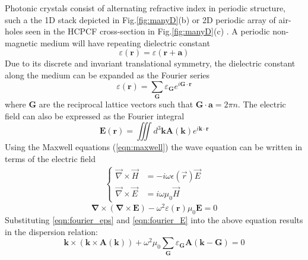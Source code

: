 \clearpage
Photonic crystals consist of alternating refractive index in periodic structure, such a the 1D stack depicted in Fig.\ref{fig:manyD}(b) or 2D periodic array of air-holes seen in the HCPCF cross-section in Fig.\ref{fig:manyD}(c) . A periodic non-magnetic medium will have repeating dielectric constant \cite{yariv}
\begin{equation}
	\varepsilon(\boldsymbol{r}) = \varepsilon(\boldsymbol{r}+\boldsymbol{a})
\end{equation}
Due to its discrete and invariant translational symmetry, the dielectric constant along the medium can be expanded as the Fourier series
\begin{equation}
	\varepsilon(\boldsymbol{r}) = \sum_{\boldsymbol{G}}\varepsilon_{\boldsymbol{G}}e^{i\boldsymbol{G}\cdot\boldsymbol{r}}
	\label{eqn:fourier_eps}
\end{equation}
where $\boldsymbol{G}$ are the reciprocal lattice vectors such that $\boldsymbol{G}\cdot\boldsymbol{a} = 2\pi n$. The electric field can also be expressed as the Fourier integral
\begin{equation}
	\boldsymbol{E}(\boldsymbol{r}) = \iiint d^3\boldsymbol{k}\boldsymbol{A}(\boldsymbol{k})e^{i\boldsymbol{k}\cdot\boldsymbol{r}}
	\label{eqn:fourier_E}
\end{equation}
Using the Maxwell equations (\ref{eqn:maxwell}) the wave equation can be written in terms of the electric field
\begin{equation}
	\begin{aligned}
		\begin{cases}
			\vec{\nabla}\times\vec{H} & = -i\omega\epsilon(\vec{r})\vec{E} \\
			\vec{\nabla}\times\vec{E} & = i\omega\mu_0\vec{H}
		\end{cases}
	\end{aligned}
	\label{eqn:maxwell}
\end{equation}
\begin{equation}
	\boldsymbol{\nabla}\times(\boldsymbol{\nabla}\times\boldsymbol{E})-\omega^2\varepsilon(\boldsymbol{r})\mu_0\boldsymbol{E} = 0
\end{equation}
Substituting \eqref{eqn:fourier_eps} and \eqref{eqn:fourier_E} into the above equation results in the dispersion relation:
\begin{equation}
	\boldsymbol{k}\times(\boldsymbol{k}\times\boldsymbol{A}(\boldsymbol{k})) + \omega^2\mu_0\sum_{\boldsymbol{G}}\varepsilon_{\boldsymbol{G}}\boldsymbol{A}(\boldsymbol{k}-\boldsymbol{G}) = 0
	\label{eqn:separation}
\end{equation}
